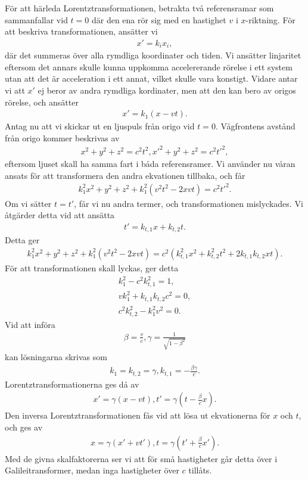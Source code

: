 För att härleda Lorentztransformationen, betrakta två referensramar som sammanfallar vid $t = 0$ där den ena rör sig med en hastighet $v$ i $x$-riktning. För att beskriva transformationen, ansätter vi
\begin{align*}
	x' = k_{i}x_{i},
\end{align*}
där det summeras över alla rymdliga koordinater och tiden. Vi ansätter linjaritet eftersom det annars skulle kunna uppkomma accelererande rörelse i ett system utan att det är acceleration i ett annat, vilket skulle vara konstigt. Vidare antar vi att $x'$ ej beror av andra rymdliga kordinater, men att den kan bero av origos rörelse, och ansätter
\begin{align*}
	x' = k_{1}(x - vt).
\end{align*}
Antag nu att vi skickar ut en ljuspuls från origo vid $t = 0$. Vågfrontens avstånd från origo kommer beskrivas av
\begin{align*}
	x^{2} + y^{2} + z^{2} = c^{2}t^{2},
	x'^{2} + y^{2} + z^{2} = c^{2}t'^{2},
\end{align*}
eftersom ljuset skall ha samma fart i båda referensramer. Vi använder nu våran ansats för att transformera den andra ekvationen tillbaka, och får
\begin{align*}
	k_{1}^{2}x^{2} + y^{2} + z^{2} + k_{1}^{2}(v^{2}t^{2} - 2xvt) = c^{2}t'^{2}.
\end{align*}
Om vi sätter $t = t'$, får vi nu andra termer, och transformationen mislyckades. Vi åtgärder detta vid att ansätta
\begin{align*}
	t' = k_{t, 1}x + k_{t, 2}t.
\end{align*}
Detta ger
\begin{align*}
	k_{1}^{2}x^{2} + y^{2} + z^{2} + k_{1}^{2}(v^{2}t^{2} - 2xvt) = c^{2}(k_{t, 1}^{2}x^{2} + k_{t, 2}^{2}t^{2} + 2k_{t, 1}k_{t, 2}xt).
\end{align*}
För att transformationen skall lyckas, ger detta
\begin{align*}
	k_{1}^{2} - c^{2}k_{t, 1}^{2} = 1, \\
	vk_{1}^{2} + k_{t, 1}k_{t, 2}c^{2} = 0, \\
	c^{2}k_{t, 2}^{2} - k_{1}^{2}v^{2} = 0.
\end{align*}
Vid att införa
\begin{align*}
	\beta = \frac{v}{c}, \gamma = \frac{1}{\sqrt{1 - \beta^{2}}}
\end{align*}
kan lösningarna skrivas som
\begin{align*}
	k_{1} = k_{t, 2} = \gamma, k_{t, 1} = -\frac{\beta\gamma}{c}.
\end{align*}
Lorentztransformationerna ges då av
\begin{align*}
	x' = \gamma(x - vt), t' = \gamma\left(t - \frac{\beta}{c}x\right).
\end{align*}
Den inversa Lorentztransformationen fås vid att lösa ut ekvationerna för $x$ och $t$, och ges av
\begin{align*}
	x = \gamma(x' + vt'), t = \gamma\left(t' + \frac{\beta}{c}x'\right).
\end{align*}
Med de givna skalfaktorerna ser vi att för små hastigheter går detta över i Galileitransformer, medan inga hastigheter över $c$ tillåts.

